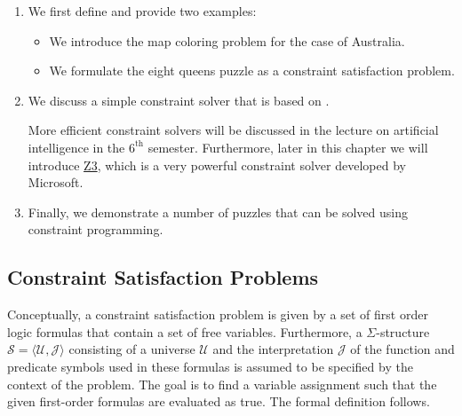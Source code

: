 \begin{enumerate}
\item We first define  and provide two examples:
      \begin{itemize}
      \item We introduce the map coloring problem for the case of Australia.
      \item We formulate the eight queens puzzle as a constraint satisfaction problem.  
      \end{itemize}
\item We discuss a simple constraint solver that is based on .

      More efficient constraint solvers will be discussed in the lecture on artificial intelligence in the
      $6^{\mathrm{th}}$ semester.  Furthermore, later in this chapter we will introduce
      \href{https://www.microsoft.com/en-us/research/project/z3-3/}{Z3}, which is a very powerful
      constraint solver developed by Microsoft.
\item Finally, we demonstrate a number of puzzles that can be solved using constraint programming.
\end{enumerate}

\subsection{Constraint Satisfaction Problems}
Conceptually, a constraint satisfaction problem is given by a set of first order logic formulas that contain a
set of free variables.  Furthermore, a $\Sigma$-structure $\mathcal{S} = \langle \mathcal{U},
\mathcal{J}\rangle $
consisting of a universe $\mathcal{U}$ and the interpretation $\mathcal{J}$ of the function and predicate 
symbols used in these formulas is assumed to be specified by the context of the problem.  The goal is 
to find a variable assignment such that the given first-order formulas are evaluated as true.  The formal
definition follows.

